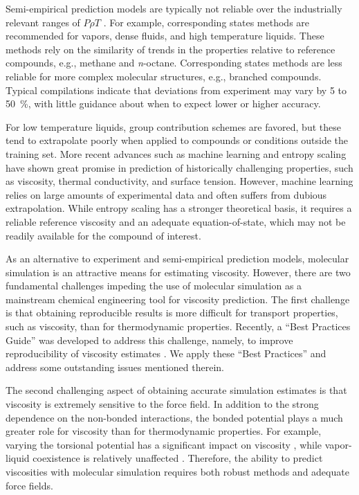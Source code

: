 \documentclass[preprint,review,12pt]{elsarticle}
\begin{document}
    Semi-empirical prediction models are typically not reliable over the industrially relevant ranges of $P \rho T$ \cite{PGL}. For example, corresponding states methods are recommended for vapors, dense fluids, and high temperature liquids. These methods rely on the similarity of trends in the properties relative to reference compounds, e.g., methane and \textit{n}-octane. Corresponding states methods are less reliable for more complex molecular structures, e.g., branched compounds. Typical compilations indicate that deviations from experiment may vary by 5 to 50~\%, with little guidance about when to expect lower or higher accuracy. 
    
    For low temperature liquids, group contribution schemes are favored, but these tend to extrapolate poorly when applied to compounds or conditions outside the training set. More recent advances such as machine learning \cite{Mulero2017,Lee2017} and entropy scaling \cite{Lotgering2015} have shown great promise in prediction of historically challenging properties, such as viscosity, thermal conductivity, and surface tension. However, machine learning relies on large amounts of experimental data and often suffers from dubious extrapolation. While entropy scaling has a stronger theoretical basis, it requires a reliable reference viscosity and an adequate equation-of-state, which may not be readily available for the compound of interest.
	
	As an alternative to experiment and semi-empirical prediction models, molecular simulation is an attractive means for estimating viscosity. However, there are two fundamental challenges impeding the use of molecular simulation as a mainstream chemical engineering tool for viscosity prediction. The first challenge is that obtaining reproducible results is more difficult for transport properties, such as viscosity, than for thermodynamic properties. Recently, a ``Best Practices Guide'' was developed to address this challenge, namely, to improve reproducibility of viscosity estimates \cite{Maginn2018}. We apply these ``Best Practices'' and address some outstanding issues mentioned therein.
	
	The second challenging aspect of obtaining accurate simulation estimates is that viscosity is extremely sensitive to the force field. In addition to the strong dependence on the non-bonded interactions, the bonded potential plays a much greater role for viscosity than for thermodynamic properties. For example, varying the torsional potential has a significant impact on viscosity \cite{Nieto2006}, while vapor-liquid coexistence is relatively unaffected \cite{Bernard2009}. Therefore, the ability to predict viscosities with molecular simulation requires both robust methods and adequate force fields. 
	
\end{document}
